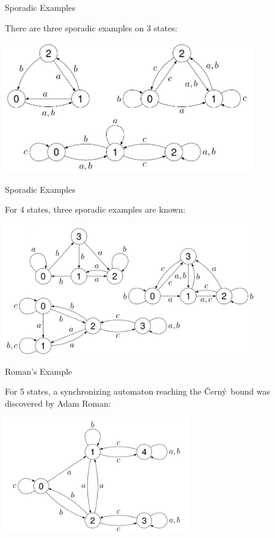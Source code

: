 \documentclass[xcolor=dvipsnames,9pt,hide notes,mathserif]{beamer}
\theoremstyle{definition}
\theoremstyle{remark}
\numberwithin{theorem}{section}
\numberwithin{claim}{section}
\numberwithin{equation}{section}
\numberwithin{conjecture}{section}
\newcommand{\czerny}{\v{C}ern\'{y}}
\newcommand{\<}{\ensuremath{\langle}}
\renewcommand{\>}{\ensuremath{\rangle}}
\begin{document}
\begin{frame}[label=Sporadic]{Sporadic Examples}

There are three sporadic examples on 3 states:
\begin{center}
  \includegraphics[height=2.25in]{Sporadic3}
\end{center}
\end{frame}

\begin{frame}[label=Sporadic]{Sporadic Examples}

For 4 states, three sporadic examples are known:
\begin{center}
  \includegraphics[height=2.25in]{Sporadic4}
\end{center}
\end{frame}

\begin{frame}[label=Sporadic]{Roman's Example}

For 5 states, a synchronizing automaton reaching the \czerny\ bound was
discovered by Adam Roman:
\begin{center}
  \includegraphics[height=2in]{Roman5}
\end{center}
\end{frame}
\end{document}
